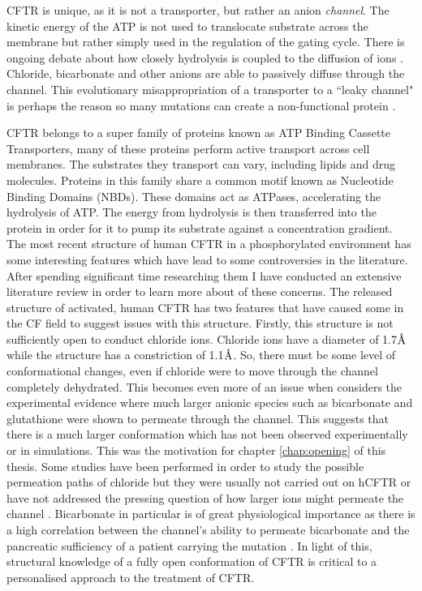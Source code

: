 CFTR is unique, as it is not a transporter, but rather an anion \textit{channel}. The kinetic energy of the ATP is not used to translocate substrate across the membrane but rather simply used in the regulation of the gating cycle. There is ongoing debate about how closely hydrolysis is coupled to the diffusion of ions \cite{}. Chloride, bicarbonate and other anions are able to passively diffuse through the channel. This evolutionary misappropriation of a transporter to a ``leaky channel" is perhaps the reason so many mutations can create a non-functional protein \cite{depristo2005,linsdell2018}.

CFTR belongs to a super family of proteins known as ATP Binding Cassette Transporters,  many of these proteins perform active transport across cell membranes. The substrates they transport can vary, including lipids and drug molecules. Proteins in this family share a common motif known as Nucleotide Binding Domains (NBDs). These domains act as ATPases, accelerating the hydrolysis of ATP. The energy from hydrolysis is then transferred into the protein in order for it to pump its substrate against a concentration gradient. 
The most recent structure of human CFTR in a phosphorylated environment has some interesting features which have lead to some controversies in the literature. After spending significant time researching them I have conducted an extensive literature review in order to learn more about of these concerns. The released structure of activated, human CFTR has two features that have caused some in the CF field to suggest issues with this structure. Firstly, this structure is not sufficiently open to conduct chloride ions. Chloride ions have a diameter of 1.7$\textup{\AA}$ while the structure has a constriction of 1.1$\textup{\AA}$\cite{zhang2018}. So, there must be some level of conformational changes, even if chloride were to move through the channel completely dehydrated. This becomes even more of an issue when considers the experimental evidence where much larger anionic species such as bicarbonate and glutathione were shown to permeate through the channel\cite{kogan2003}. This suggests that there is a much larger conformation which has not been observed experimentally or in simulations. This was the motivation for chapter \ref{chap:opening} of this thesis. Some studies have been performed in order to study the possible permeation paths of chloride but they were usually not carried out on hCFTR or have not addressed the pressing question of how larger ions might permeate the channel \cite{farkas2020, zeng2021}. Bicarbonate in particular is of great physiological importance as there is a high correlation between the channel's ability to permeate bicarbonate and the pancreatic sufficiency of a patient carrying the mutation \cite{}. In light of this, structural knowledge of a fully open conformation of CFTR is critical to a personalised approach to the treatment of CFTR.

